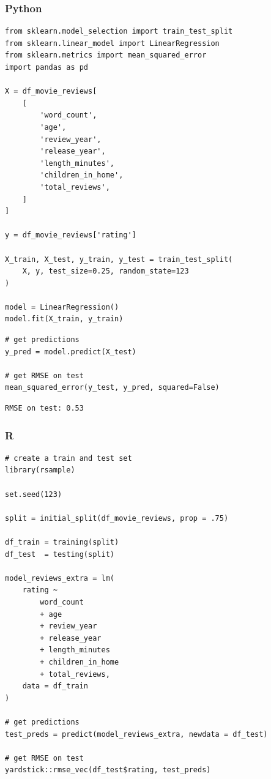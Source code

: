 \documentclass[
  letterpaper,
]{krantz}
\begin{document}
\subsubsection{Python}

\begin{verbatim}
from sklearn.model_selection import train_test_split
from sklearn.linear_model import LinearRegression
from sklearn.metrics import mean_squared_error
import pandas as pd

X = df_movie_reviews[
    [
        'word_count',
        'age',
        'review_year',
        'release_year',
        'length_minutes',
        'children_in_home',
        'total_reviews',
    ]
]

y = df_movie_reviews['rating']

X_train, X_test, y_train, y_test = train_test_split(
    X, y, test_size=0.25, random_state=123
)

model = LinearRegression()
model.fit(X_train, y_train)
\end{verbatim}

\begin{verbatim}
# get predictions
y_pred = model.predict(X_test)

# get RMSE on test
mean_squared_error(y_test, y_pred, squared=False)
\end{verbatim}

\begin{verbatim}
RMSE on test: 0.53
\end{verbatim}

\subsubsection{R}

\begin{verbatim}
# create a train and test set
library(rsample)

set.seed(123)

split = initial_split(df_movie_reviews, prop = .75)

df_train = training(split)
df_test  = testing(split)

model_reviews_extra = lm(
    rating ~
        word_count
        + age
        + review_year
        + release_year
        + length_minutes
        + children_in_home
        + total_reviews,
    data = df_train
)

# get predictions
test_preds = predict(model_reviews_extra, newdata = df_test)

# get RMSE on test
yardstick::rmse_vec(df_test$rating, test_preds)
\end{verbatim}
\end{document}
